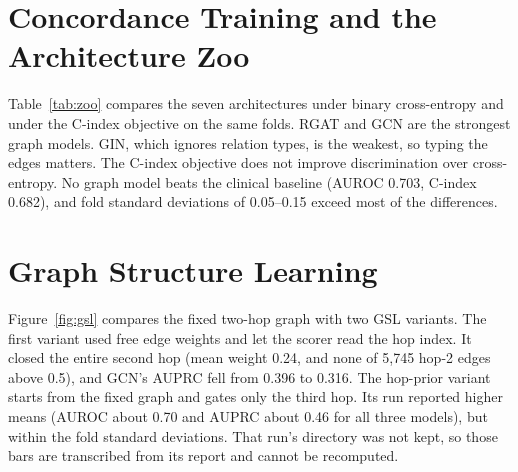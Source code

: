 \documentclass{mnnit}
\begin{document}
\section{Concordance Training and the Architecture Zoo}
Table~\ref{tab:zoo} compares the seven architectures under binary cross-entropy and under the C-index objective
on the same folds. RGAT and GCN are the strongest graph models. GIN, which ignores relation types, is the weakest,
so typing the edges matters. The C-index objective does not improve discrimination over cross-entropy. No graph
model beats the clinical baseline (AUROC 0.703, C-index 0.682), and fold standard deviations of 0.05--0.15 exceed
most of the differences.

\begin{table}[htbp]
  \centering
  \small\setlength{\tabcolsep}{4pt}
  \caption{36-month endpoint: AUROC, AUPRC, and Harrell's C (five-fold means) under two objectives.}
  \label{tab:zoo}
\end{table}

\section{Graph Structure Learning}
Figure~\ref{fig:gsl} compares the fixed two-hop graph with two GSL variants. The first variant used free edge
weights and let the scorer read the hop index. It closed the entire second hop (mean weight 0.24, and none of 5,745
hop-2 edges above 0.5), and GCN's AUPRC fell from 0.396 to 0.316. The hop-prior variant starts from the fixed graph
and gates only the third hop. Its run reported higher means (AUROC about 0.70 and AUPRC about 0.46 for all three
models), but within the fold standard deviations. That run's directory was not kept, so those bars are transcribed
from its report and cannot be recomputed.
\end{document}
